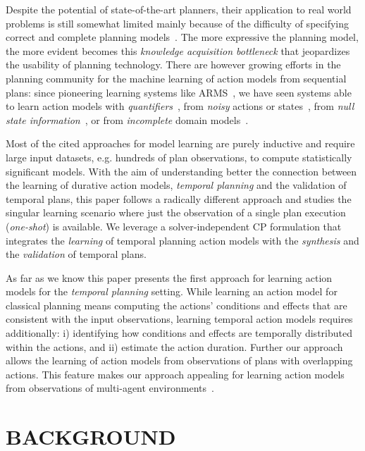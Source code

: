 \documentclass{ecai}
\begin{document}
Despite the potential of state-of-the-art planners, their application to real world problems is still somewhat limited mainly because of the difficulty of specifying correct and complete planning models~\cite{kambhampati2007model}. The more expressive the planning model, the more evident becomes this {\em knowledge acquisition bottleneck} that jeopardizes the usability of planning technology. There are however growing efforts in the planning community for the machine learning of action models from sequential plans: since pioneering learning systems like ARMS~\cite{yang2007learning}, we have seen systems able to learn action models with {\em quantifiers}~\cite{AmirC08,ZhuoYHL10}, from {\em noisy} actions or states~\cite{MouraoZPS12,zhuo2013action}, from {\em null state information}~\cite{cresswell2013}, or from {\em incomplete} domain models~\cite{ZhuoK17,ZhuoNK13}.

Most of the cited approaches for model learning are purely inductive and require large input datasets, e.g. hundreds of plan observations, to compute statistically significant models. With the aim of understanding better the connection between the learning of durative action models, {\em temporal planning}  and the validation of temporal plans, this paper follows a radically different approach and studies the singular learning scenario where just the observation of a single plan execution ({\em one-shot}) is available. We leverage a solver-independent CP formulation that integrates the {\em learning} of temporal planning action models with the {\em synthesis} and the {\em validation} of temporal plans. 

As far as we know this paper presents the first approach for learning action models for the {\em temporal planning} setting. While learning an action model for classical planning means computing the actions' conditions and effects that are consistent with the input observations, learning temporal action models requires additionally: i) identifying how conditions and effects are temporally distributed within the actions, and ii) estimate the action duration. Further our approach allows the learning of action models from observations of plans with overlapping actions. This feature makes our approach appealing for learning action models from observations of multi-agent environments~\cite{furelos2018carpool}. 



\section{BACKGROUND}
\end{document}
